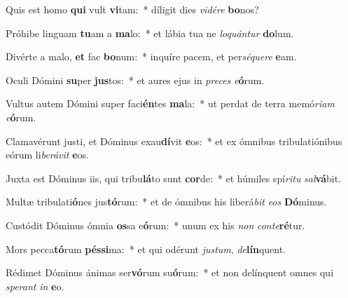 \item Quis est homo \textbf{qui} vult \textbf{vi}tam:~* díligit dies \textit{vi}\textit{dé}\textit{re} \textbf{bo}nos?
\item Próhibe linguam \textbf{tu}am a \textbf{ma}lo:~* et lábia tua ne \textit{lo}\textit{quán}\textit{tur} \textbf{do}lum.
\item Divérte a malo, \textbf{et} fac \textbf{bo}num:~* inquíre pacem, et per\textit{sé}\textit{que}\textit{re} \textbf{e}am.
\item Oculi Dómini \textbf{su}per \textbf{jus}tos:~* et aures ejus in \textit{pre}\textit{ces} \textit{e}\textbf{ó}rum.
\item Vultus autem Dómini super faci\textbf{én}tes \textbf{ma}la:~* ut perdat de terra memó\textit{ri}\textit{am} \textit{e}\textbf{ó}rum.
\item Clamavérunt justi, et Dóminus exau\textbf{dí}vit \textbf{e}os:~* et ex ómnibus tribulatiónibus eórum li\textit{be}\textit{rá}\textit{vit} \textbf{e}os.
\item Juxta est Dóminus iis, qui tribu\textbf{lá}to sunt \textbf{cor}de:~* et húmiles spí\textit{ri}\textit{tu} \textit{sal}\textbf{vá}bit.
\item Multæ tribulati\textbf{ó}nes jus\textbf{tó}rum:~* et de ómnibus his liberá\textit{bit} \textit{e}\textit{os} \textbf{Dó}minus.
\item Custódit Dóminus ómnia \textbf{os}sa e\textbf{ó}rum:~* unum ex his \textit{non} \textit{con}\textit{te}\textbf{ré}tur.
\item Mors pecca\textbf{tó}rum \textbf{pés}\textbf{si}ma:~* et qui odérunt \textit{jus}\textit{tum}, \textit{de}\textbf{lín}quent.
\item Rédimet Dóminus ánimas ser\textbf{vó}rum su\textbf{ó}rum:~* et non delínquent omnes qui \textit{spe}\textit{rant} \textit{in} \textbf{e}o.
